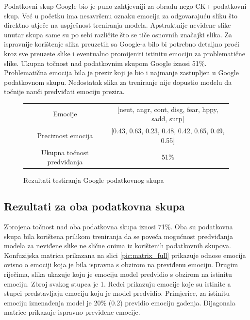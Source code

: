 \documentclass[times, utf8, zavrsni,numeric,pstricks]{fer}
\begin{document}
Podatkovni skup Google bio je puno zahtjevniji za obradu nego CK+ podatkovni skup. Već u početku ima nesavršenu oznaku emocija za odgovarajuću sliku što direktno utječe na uspješnost treniranja modela. Apstraktnije neviđene slike unutar skupa same su po sebi različite što se tiče osnovnih značajki slika. Za ispravnije korištenje slika preuzetih sa Google-a bilo bi potrebno detaljno proći kroz sve preuzete slike i eventualno promijeniti istinitu emociju za problematične slike. Ukupna točnost nad podatkovnim skupom Google iznosi 51\%. Problematična emocija bila je prezir koji je bio i najmanje zastupljen u Google podatkovnom skupu. Nedostatak slika za treniranje nije dopustio modelu da točnije nauči predviđati emociju prezira.

\begin{figure}[H]
\centering
		\begin{tabular}
					{|c|c|}\hline
					Emocije & [neut, angr, cont, disg, fear, hppy, sadd, surp]\\
					Preciznost emocija& [0.43, 0.63, 0.23, 0.48, 0.42, 0.65, 0.49, 0.55]\\
					Ukupna točnost predviđanja & 51\%\\
					\hline
		\end{tabular}
		\caption{Rezultati testiranja Google podatkovnog skupa}
\end{figure}


\subsection{Rezultati za oba podatkovna skupa}

Zbrojena točnost nad oba podatkovna skupa iznosi 71\%. Oba su podatkovna skupa bila korištena prilikom treniranja da se poveća mogućnost predviđanja modela za neviđene slike ne slične onima iz korištenih podatkovnih skupova. Konfuzijska matrica prikazana na slici \ref{pic:matrix_full} prikazuje odnose emocija ovisno o emociji koja je bila ispravna s obzirom na previđenu emociju. Drugim riječima, slika ukazuje koju je emociju model predvidio s obzirom na istinitu emociju. Zbroj svakog stupca je 1. Redci prikazuju emocije koje su istinite a stupci predstavljaju emociju koju je model predvidio. Primjerice, za istinitu emociju iznenađenja  model je 20\% (0.2) previdio emociju gađenja. Dijagonala matrice prikazuje ispravno previđene emocije.
\end{document}
